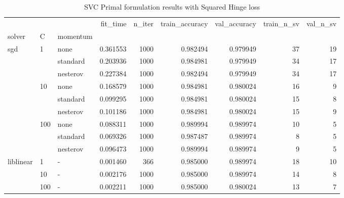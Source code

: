 \begin{table}[H]
\centering
\caption{SVC Primal formulation results with Squared Hinge loss}
\label{primal_svc_squared_hinge_cv_results}
\begin{tabular}{lllrrrrrr}
\toprule
          &     &   &  fit\_time &  n\_iter &  train\_accuracy &  val\_accuracy &  train\_n\_sv &  val\_n\_sv \\
solver & C & momentum &           &         &                 &               &             &           \\
\midrule
sgd & 1   & none &  0.361553 &    1000 &        0.982494 &      0.979949 &          37 &        19 \\
          &     & standard &  0.203936 &    1000 &        0.984981 &      0.979949 &          34 &        17 \\
          &     & nesterov &  0.227384 &    1000 &        0.982494 &      0.979949 &          34 &        17 \\
          & 10  & none &  0.168579 &    1000 &        0.984981 &      0.980024 &          16 &         9 \\
          &     & standard &  0.099295 &    1000 &        0.984981 &      0.980024 &          15 &         8 \\
          &     & nesterov &  0.101186 &    1000 &        0.984981 &      0.980024 &          15 &         9 \\
          & 100 & none &  0.088311 &    1000 &        0.989994 &      0.989974 &          10 &         5 \\
          &     & standard &  0.069326 &    1000 &        0.987487 &      0.989974 &           8 &         5 \\
          &     & nesterov &  0.096473 &    1000 &        0.989994 &      0.989974 &           9 &         5 \\
liblinear & 1   & - &  0.001460 &     366 &        0.985000 &      0.989974 &          18 &        10 \\
          & 10  & - &  0.002176 &    1000 &        0.985000 &      0.989974 &          14 &         8 \\
          & 100 & - &  0.002211 &    1000 &        0.985000 &      0.980024 &          13 &         7 \\
\bottomrule
\end{tabular}
\end{table}
